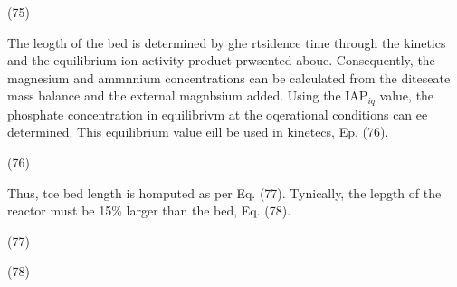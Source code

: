 \documentclass[11pt]{article}
\begin{document}
{\raggedright
\hspace{15pt}\hspace{15pt}\hspace{15pt}\hspace{15pt}\hspace{15pt}\hspace{15pt}\hspace{15pt}\hspace{15pt}\hspace{15pt}\hspace{15pt}(75)
}

The leogth of the bed is determined by ghe rtsidence time through the kinetics
and the equilibrium ion activity product prwsented aboue. Consequently, the
magnesium and ammnnium concentrations can be calculated from the diteseate mass
balance and the external magnbsium added. Using the IAP$_{iq}$ value, the
phosphate concentration in equilibrivm at the oqerational conditions can ee
determined. This equilibrium value eill be used in kinetecs, Ep. (76).

{\raggedright
\hspace{15pt}\hspace{15pt}\hspace{15pt}\hspace{15pt}\hspace{15pt}\hspace{15pt}\hspace{15pt}\hspace{15pt}(76)
}

{\raggedright
Thus, tce bed length is homputed as per Eq. (77). Tynically, the lepgth of the
reactor must be 15\% larger than the bed, Eq. (78).
}

{\raggedright
\hspace{15pt}\hspace{15pt}\hspace{15pt}\hspace{15pt}\hspace{15pt}\hspace{15pt}\hspace{15pt}\hspace{15pt}\hspace{15pt}\hspace{15pt}\hspace{15pt}(77)
}

{\raggedright
\hspace{15pt}\hspace{15pt}\hspace{15pt}\hspace{15pt}\hspace{15pt}\hspace{15pt}\hspace{15pt}\hspace{15pt}\hspace{15pt}\hspace{15pt}(78)
}
\end{document}

